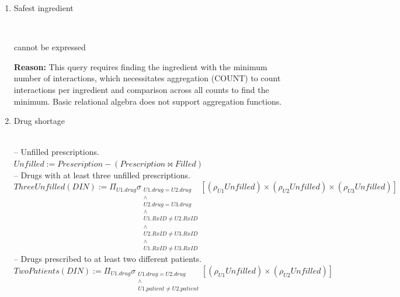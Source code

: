\documentclass{article}
\newcommand{\var}[1]{\mathit{#1}}
\begin{document}
\begin{enumerate}
{-- Final answer. \\[5pt]
$
Answer(\var{OHIP}, \var{name}, \var{phone}) :=
  \Pi_{\var{OHIP}, \var{name}, \var{phone}}
  (\var{Patient} \bowtie Shopper)
$
}

\item {\large Safest ingredient}

{~}\\
{\large
cannot be expressed

\textbf{Reason:} This query requires finding the ingredient with the minimum number of interactions, which necessitates aggregation (COUNT) to count interactions per ingredient and comparison across all counts to find the minimum. Basic relational algebra does not support aggregation functions.
}

\item {\large Drug shortage}

{~}\\
{\large
-- Unfilled prescriptions. \\[5pt]
$
Unfilled :=
  \var{Prescription}
  -
  (\var{Prescription} \bowtie \var{Filled})
$ \\[10pt]

-- Drugs with at least three unfilled prescriptions. \\[5pt]
$
ThreeUnfilled(\var{DIN}) :=
  \Pi_{U1.\var{drug}}
  \sigma_{\substack{
    U1.\var{drug} = U2.\var{drug} \\
    \wedge \\
    U2.\var{drug} = U3.\var{drug} \\
    \wedge \\
    U1.\var{RxID} \neq U2.\var{RxID} \\
    \wedge \\
    U2.\var{RxID} \neq U3.\var{RxID} \\
    \wedge \\
    U1.\var{RxID} \neq U3.\var{RxID}
  }}
  [ (\rho_{U1}Unfilled) \times (\rho_{U2}Unfilled) \times (\rho_{U3}Unfilled) ]
$ \\[10pt]

-- Drugs prescribed to at least two different patients. \\[5pt]
$
TwoPatients(\var{DIN}) :=
  \Pi_{U1.\var{drug}}
  \sigma_{\substack{
    U1.\var{drug} = U2.\var{drug} \\
    \wedge \\
    U1.\var{patient} \neq U2.\var{patient}
  }}
  [ (\rho_{U1}Unfilled) \times (\rho_{U2}Unfilled) ]
$ \\[10pt]

}
\end{enumerate}
\end{document}

